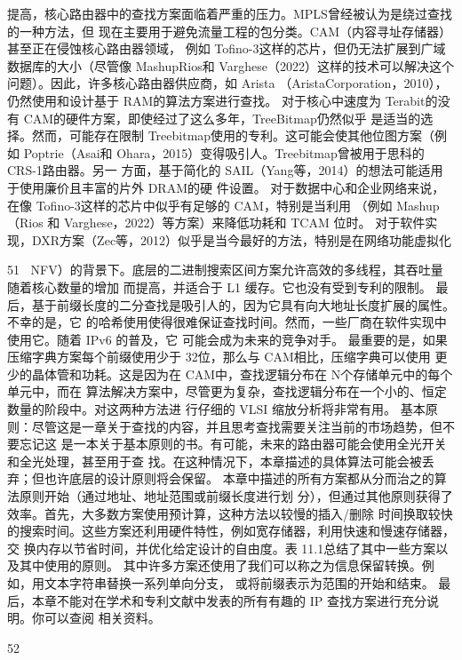 提高，核心路由器中的查找方案面临着严重的压力。MPLS曾经被认为是绕过查找的一种方法，但
现在主要用于避免流量工程的包分类。CAM（内容寻址存储器）甚至正在侵蚀核心路由器领域，
例如 Tofino-3这样的芯片，但仍无法扩展到广域数据库的大小（尽管像 MashupRios和
Varghese（2022）这样的技术可以解决这个问题）。因此，许多核心路由器供应商，如 Arista
（AristaCorporation，2010），仍然使用和设计基于 RAM的算法方案进行查找。
对于核心中速度为 Terabit的没有 CAM的硬件方案，即使经过了这么多年，TreeBitmap仍然似乎
是适当的选择。然而，可能存在限制 Treebitmap使用的专利。这可能会使其他位图方案（例如
Poptrie（Asai和 Ohara，2015）变得吸引人。Treebitmap曾被用于思科的 CRS-1路由器。另一
方面，基于简化的 SAIL（Yang等，2014）的想法可能适用于使用廉价且丰富的片外 DRAM的硬
件设置。
对于数据中心和企业网络来说，在像 Tofino-3这样的芯片中似乎有足够的 CAM，特别是当利用
（例如 Mashup（Rios 和 Varghese，2022）等方案）来降低功耗和 TCAM 位时。
对于软件实现，DXR方案（Zec等，2012）似乎是当今最好的方法，特别是在网络功能虚拟化

                                                          51
（NFV）的背景下。底层的二进制搜索区间方案允许高效的多线程，其吞吐量随着核心数量的增加
而提高，并适合于 L1 缓存。它也没有受到专利的限制。
最后，基于前缀长度的二分查找是吸引人的，因为它具有向大地址长度扩展的属性。不幸的是，它
的哈希使用使得很难保证查找时间。然而，一些厂商在软件实现中使用它。随着 IPv6 的普及，它
可能会成为未来的竞争对手。
最重要的是，如果压缩字典方案每个前缀使用少于 32位，那么与 CAM相比，压缩字典可以使用
更少的晶体管和功耗。这是因为在 CAM中，查找逻辑分布在 N个存储单元中的每个单元中，而在
算法解决方案中，尽管更为复杂，查找逻辑分布在一个小的、恒定数量的阶段中。对这两种方法进
行仔细的 VLSI 缩放分析将非常有用。
基本原则：尽管这是一章关于查找的内容，并且思考查找需要关注当前的市场趋势，但不要忘记这
是一本关于基本原则的书。有可能，未来的路由器可能会使用全光开关和全光处理，甚至用于查
找。在这种情况下，本章描述的具体算法可能会被丢弃；但也许底层的设计原则将会保留。
本章中描述的所有方案都从分而治之的算法原则开始（通过地址、地址范围或前缀长度进行划
分），但通过其他原则获得了效率。首先，大多数方案使用预计算，这种方法以较慢的插入/删除
时间换取较快的搜索时间。这些方案还利用硬件特性，例如宽存储器，利用快速和慢速存储器，交
换内存以节省时间，并优化给定设计的自由度。表 11.1总结了其中一些方案以及其中使用的原则。
其中许多方案还使用了我们可以称之为信息保留转换。例如，用文本字符串替换一系列单向分支，
或将前缀表示为范围的开始和结束。
最后，本章不能对在学术和专利文献中发表的所有有趣的 IP 查找方案进行充分说明。你可以查阅
相关资料。




                                            52
